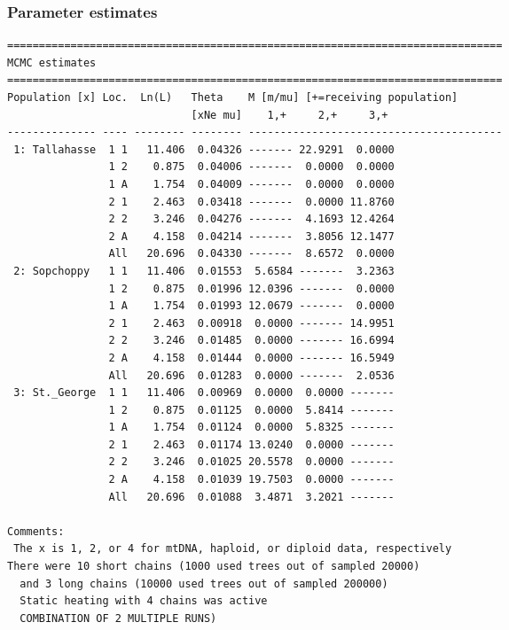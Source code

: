 \subsubsection{Parameter estimates}
\begin{center}
\begin{boxedminipage}{6in}
\begin{small}
\begin{tt}
\begin{verbatim}
==============================================================================
MCMC estimates 
==============================================================================
Population [x] Loc.  Ln(L)   Theta    M [m/mu] [+=receiving population]  
                             [xNe mu]    1,+     2,+     3,+    
-------------- ---- -------- -------- ----------------------------------------
 1: Tallahasse  1 1   11.406  0.04326 ------- 22.9291  0.0000 
                1 2    0.875  0.04006 -------  0.0000  0.0000 
                1 A    1.754  0.04009 -------  0.0000  0.0000 
                2 1    2.463  0.03418 -------  0.0000 11.8760 
                2 2    3.246  0.04276 -------  4.1693 12.4264 
                2 A    4.158  0.04214 -------  3.8056 12.1477 
                All   20.696  0.04330 -------  8.6572  0.0000 
 2: Sopchoppy   1 1   11.406  0.01553  5.6584 -------  3.2363 
                1 2    0.875  0.01996 12.0396 -------  0.0000 
                1 A    1.754  0.01993 12.0679 -------  0.0000 
                2 1    2.463  0.00918  0.0000 ------- 14.9951 
                2 2    3.246  0.01485  0.0000 ------- 16.6994 
                2 A    4.158  0.01444  0.0000 ------- 16.5949 
                All   20.696  0.01283  0.0000 -------  2.0536 
 3: St._George  1 1   11.406  0.00969  0.0000  0.0000 -------
                1 2    0.875  0.01125  0.0000  5.8414 -------
                1 A    1.754  0.01124  0.0000  5.8325 -------
                2 1    2.463  0.01174 13.0240  0.0000 -------
                2 2    3.246  0.01025 20.5578  0.0000 -------
                2 A    4.158  0.01039 19.7503  0.0000 -------
                All   20.696  0.01088  3.4871  3.2021 -------

Comments:
 The x is 1, 2, or 4 for mtDNA, haploid, or diploid data, respectively
There were 10 short chains (1000 used trees out of sampled 20000)
  and 3 long chains (10000 used trees out of sampled 200000)
  Static heating with 4 chains was active
  COMBINATION OF 2 MULTIPLE RUNS)
\end{verbatim}
\end{tt}
\end{small}
\end{boxedminipage}
\end{center}
